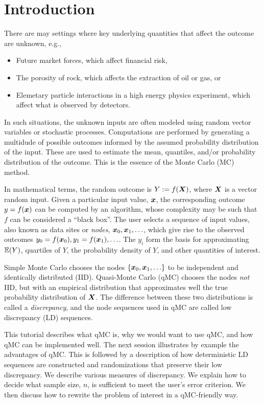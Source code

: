 \documentclass{svproc}
\newcounter{algorithm}%
\begin{document}
\section{Introduction} \label{sec:intro}
There are may settings where key underlying quantities that affect the outcome are unknown, e.g.,
\begin{itemize}
	\item Future market forces, which affect financial risk,
	\item The porosity of rock, which affects the extraction of oil or gas, or
	\item Elemetary particle interactions in a high energy physics experiment, which affect what is observed by detectors.
\end{itemize}
In such situations, the unknown inputs are often modeled using random vector variables or stochastic processes.  Computations are performed by generating a multidude of possible outcomes informed by the assumed probability distribution of the input. These are used to estimate the mean, quantiles, and/or probability distribution of the outcome.  This is the essence of the Monte Carlo (MC) method.

In mathematical terms, the random outcome is $Y := f({\boldsymbol{X}})$, where ${\boldsymbol{X}}$ is a vector random input.  Given a particular input value, ${\boldsymbol{x}}$, the corresponding outcome  $y = f({\boldsymbol{x}})$ can be computed by an algorithm, whose complexity may be such that $f$ can be considered a ``black box''.  The user selects a sequence of input values, also known as data sites or \emph{nodes}, ${\boldsymbol{x}}_0, {\boldsymbol{x}}_1, \ldots$, which give rise to the observed outcomes $y_0 = f({\boldsymbol{x}}_0), y_1 = f({\boldsymbol{x}}_1), \ldots$.  The $y_i$ form the basis for approximating ${\mathbb{E}}(Y)$, quartiles of $Y$, the probability density of $Y$, and other quantities of interest.

Simple  Monte Carlo chooses the nodes $\{{\boldsymbol{x}}_0, {\boldsymbol{x}}_1, \ldots\}$ to be independent and identically distributed (IID).  Quasi-Monte Carlo (qMC)  chooses the nodes \emph{not} IID, but with an empirical distribution that approximates well the true probability distribution of ${\boldsymbol{X}}$.  The difference between these two distributions is called a \emph{discrepancy}, and the node sequences used in qMC are called low discrepancy (LD) sequences.

This tutorial describes what qMC is, why we would want to use qMC, and how qMC can be implemented well.  The next session illustrates by example the advantages of qMC.  This is followed by a description of how deterministic LD sequences are constructed and randomizations that preserve their low discrepancy.  We describe various measures of discrepancy.  We explain how to decide what sample size, $n$, is sufficient to meet the user's error criterion.  We then discuss how to rewrite the problem of interest in a qMC-friendly way.
\end{document}
